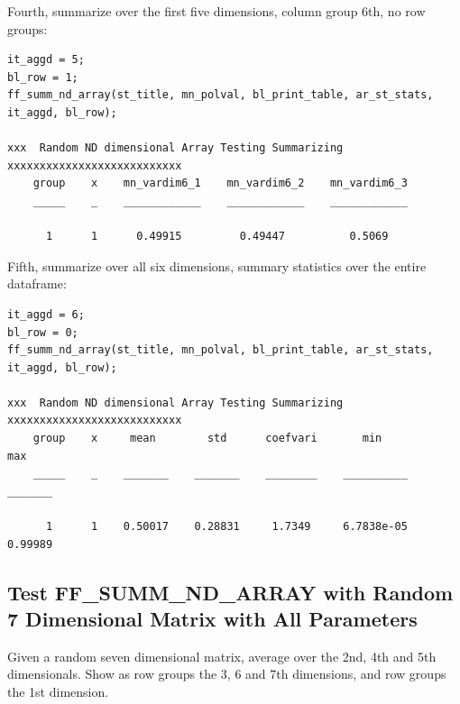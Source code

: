 \documentclass[
]{book}
\begin{document}
Fourth, summarize over the first five dimensions, column group 6th, no
row groups:

\begin{verbatim}
it_aggd = 5;
bl_row = 1; 
ff_summ_nd_array(st_title, mn_polval, bl_print_table, ar_st_stats, it_aggd, bl_row);

xxx  Random ND dimensional Array Testing Summarizing  xxxxxxxxxxxxxxxxxxxxxxxxxxx
    group    x    mn_vardim6_1    mn_vardim6_2    mn_vardim6_3
    _____    _    ____________    ____________    ____________

      1      1      0.49915         0.49447          0.5069   
\end{verbatim}

Fifth, summarize over all six dimensions, summary statistics over the
entire dataframe:

\begin{verbatim}
it_aggd = 6;
bl_row = 0; 
ff_summ_nd_array(st_title, mn_polval, bl_print_table, ar_st_stats, it_aggd, bl_row);

xxx  Random ND dimensional Array Testing Summarizing  xxxxxxxxxxxxxxxxxxxxxxxxxxx
    group    x     mean        std      coefvari       min          max  
    _____    _    _______    _______    ________    __________    _______

      1      1    0.50017    0.28831     1.7349     6.7838e-05    0.99989
\end{verbatim}

\hypertarget{test-ff_summ_nd_array-with-random-7-dimensional-matrix-with-all-parameters}{%
\subsection{Test FF\_SUMM\_ND\_ARRAY with Random 7 Dimensional Matrix with All Parameters}\label{test-ff_summ_nd_array-with-random-7-dimensional-matrix-with-all-parameters}}

Given a random seven dimensional matrix, average over the 2nd, 4th and
5th dimensionals. Show as row groups the 3, 6 and 7th dimensions, and
row groups the 1st dimension.
\end{document}
